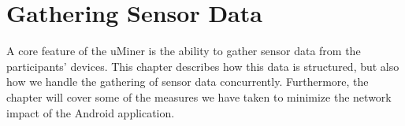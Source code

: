 \chapter{Gathering Sensor Data}
\label{cha:gathering_sensor_data}

A core feature of the uMiner is the ability to gather sensor data from the participants' devices. This chapter describes how this data is structured, but also how we handle the gathering of sensor data concurrently. Furthermore, the chapter will cover some of the measures we have taken to minimize the network impact of the Android application.









